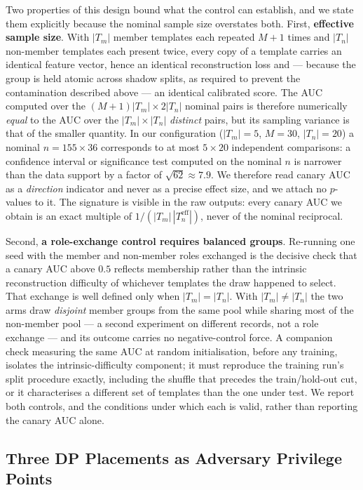 Two properties of this design bound what the control can establish, and
we state them explicitly because the nominal sample size overstates
both. First, \textbf{effective sample size}. With $|T_m|$ member
templates each repeated $M+1$ times and $|T_n|$ non-member templates
each present twice, every copy of a template carries an identical
feature vector, hence an identical reconstruction loss and --- because
the group is held atomic across shadow splits, as required to prevent
the contamination described above --- an identical calibrated score.
The AUC computed over the $(M{+}1)|T_m| \times 2|T_n|$ nominal pairs is
therefore numerically \emph{equal} to the AUC over the
$|T_m| \times |T_n|$ \emph{distinct} pairs, but its sampling variance
is that of the smaller quantity. In our configuration
($|T_m| = 5$, $M = 30$, $|T_n| = 20$) a nominal $n = 155 \times 36$
corresponds to at most $5 \times 20$ independent comparisons: a
confidence interval or significance test computed on the nominal $n$ is
narrower than the data support by a factor of $\sqrt{62} \approx 7.9$.
We therefore read canary AUC as a \emph{direction} indicator and never
as a precise effect size, and we attach no $p$-values to it. The
signature is visible in the raw outputs: every canary AUC we obtain is
an exact multiple of $1/(|T_m|\,|T_n^{\text{eff}}|)$, never of the
nominal reciprocal.

Second, \textbf{a role-exchange control requires balanced groups}.
Re-running one seed with the member and non-member roles exchanged is
the decisive check that a canary AUC above $0.5$ reflects membership
rather than the intrinsic reconstruction difficulty of whichever
templates the draw happened to select. That exchange is well defined
only when $|T_m| = |T_n|$. With $|T_m| \neq |T_n|$ the two arms draw
\emph{disjoint} member groups from the same pool while sharing most of
the non-member pool --- a second experiment on different records, not a
role exchange --- and its outcome carries no negative-control force. A
companion check measuring the same AUC at random initialisation, before
any training, isolates the intrinsic-difficulty component; it must
reproduce the training run's split procedure exactly, including the
shuffle that precedes the train/hold-out cut, or it characterises a
different set of templates than the one under test. We report both
controls, and the conditions under which each is valid, rather than
reporting the canary AUC alone.

\subsection{Three DP Placements as Adversary Privilege Points}
\label{sec:framework-dp}

